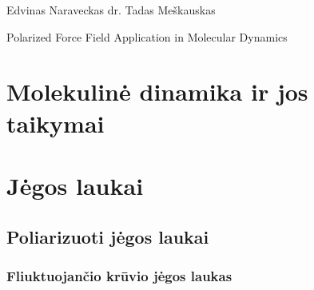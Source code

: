 \documentclass[a4paper,12pt,fleqn,tikz]{article}
\begin{document}
    {Edvinas Naraveckas}
    {}{}{}{}%
    {dr. Tadas Meškauskas}

    \tableofcontents



    \bothabstracts{}%
    {Polarized Force Field Application in Molecular Dynamics} %
    {}%


    



    \newpage
    \section{Molekulinė dinamika ir jos taikymai}
    \label{sec:molecular_dynamics_section}
    


    \newpage
    \section{Jėgos laukai}
    \label{sec:force_field}
    


    \subsection{Poliarizuoti jėgos laukai}
    \label{sec:polarized_force_fields}
    


    \subsubsection{Fliuktuojančio krūvio jėgos laukas}
    \label{sec:fluctuating_charge}
    



    \newpage
\end{document}

